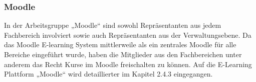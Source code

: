 \subsubsection{Moodle}
In der Arbeitsgruppe „Moodle“ sind sowohl Repräsentanten aus jedem Fachbereich involviert sowie auch Repräsentanten aus der Verwaltungsebene. Da das Moodle E-learning System mittlerweile als ein zentrales Moodle für alle Bereiche eingeführt wurde, haben die Mitglieder aus den Fachbereichen unter anderem das Recht Kurse im Moodle freischalten zu können. Auf die E-Learning Plattform „Moodle“ wird detaillierter im Kapitel 2.4.3 eingegangen.
